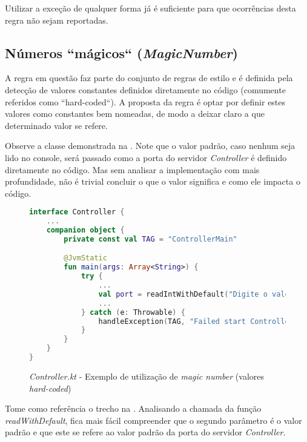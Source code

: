 Utilizar a exceção de qualquer forma já é suficiente para que ocorrências desta regra não sejam reportadas.

\subsection{Números ``mágicos`` (\textit{MagicNumber})}

A regra em questão faz parte do conjunto de regras de estilo e é definida pela detecção de valores constantes definidos diretamente no código (comumente referidos como ``hard-coded``). A proposta da regra é optar por definir estes valores como constantes bem nomeadas, de modo a deixar claro a que determinado valor se refere.

Observe a classe demonstrada na . Note que o valor padrão, caso nenhum seja lido no console, será passado como a porta do servidor \textit{Controller} é definido diretamente no código. Mas sem analisar a implementação com mais profundidade, não é trivial concluir o que o valor significa e como ele impacta o código.

\begin{figure}[H]
    \centering
    \begin{lstlisting}[language=Kotlin]
interface Controller {
    ...
    companion object {
        private const val TAG = "ControllerMain"

        @JvmStatic
        fun main(args: Array<String>) {
            try {
                ...
                val port = readIntWithDefault("Digite o valor da porta do servidor", 10097)
                ...
            } catch (e: Throwable) {
                handleException(TAG, "Failed start Controller...", e)
            }
        }
    }
}
    \end{lstlisting}
    \caption{\textit{Controller.kt} - Exemplo de utilização de \textit{magic number} (valores \textit{hard-coded})}
    \label{fig:detekt_magic_number_before_example}
\end{figure}

Tome como referência o trecho na . Analisando a chamada da função \textit{readWithDefault}, fica mais fácil compreender que o segundo parâmetro é o valor padrão e que este se refere ao valor padrão da porta do servidor \textit{Controller}.

